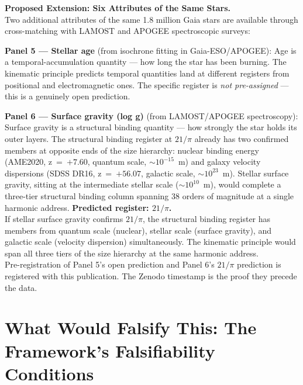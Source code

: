 \documentclass[11pt, letterpaper, openany]{book}
\begin{document}
\begin{predictionbox}
\textbf{Proposed Extension: Six Attributes of the Same Stars.}\\[0.5em]
Two additional attributes of the same 1.8 million Gaia stars are
available through cross-matching with LAMOST and APOGEE spectroscopic
surveys:

\textbf{Panel 5 --- Stellar age} (from isochrone fitting in
Gaia-ESO/APOGEE): Age is a temporal-accumulation quantity --- how
long the star has been burning. The kinematic principle predicts
temporal quantities land at different registers from positional
and electromagnetic ones. The specific register is \textit{not
pre-assigned} --- this is a genuinely open prediction.

\textbf{Panel 6 --- Surface gravity (log g)} (from LAMOST/APOGEE
spectroscopy): Surface gravity is a structural binding quantity ---
how strongly the star holds its outer layers. The structural binding
register at $21/\pi$ already has two confirmed members at opposite
ends of the size hierarchy: nuclear binding energy (AME2020,
z~=~$+7.60$, quantum scale, $\sim 10^{-15}$~m) and galaxy velocity
dispersions (SDSS DR16, z~=~$+56.07$, galactic scale,
$\sim 10^{23}$~m). Stellar surface gravity, sitting at the
intermediate stellar scale ($\sim 10^{10}$~m), would complete a
three-tier structural binding column spanning 38 orders of magnitude
at a single harmonic address.
\textbf{Predicted register: $21/\pi$.}\\[0.5em]

If stellar surface gravity confirms $21/\pi$, the structural
binding register has members from quantum scale (nuclear), stellar
scale (surface gravity), and galactic scale (velocity dispersion)
simultaneously. The kinematic principle would span all three
tiers of the size hierarchy at the same harmonic address.\\[0.5em]

Pre-registration of Panel 5's open prediction and Panel 6's
$21/\pi$ prediction is registered with this publication.
The Zenodo timestamp is the proof they precede the data.
\end{predictionbox}

\clearpage
\chapter{What Would Falsify This: The Framework's Falsifiability Conditions}
\end{document}
